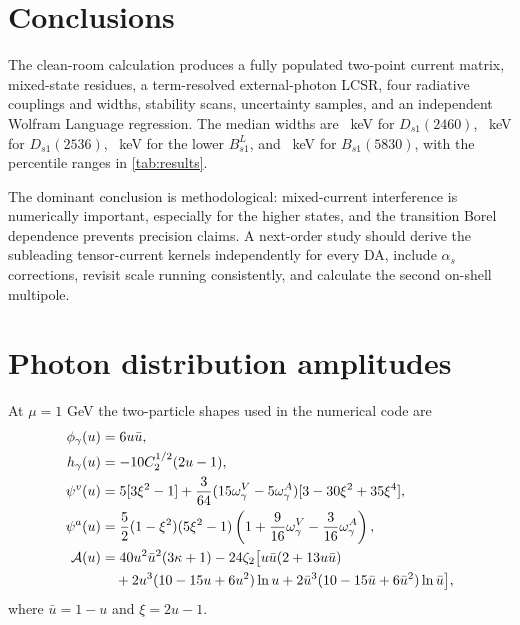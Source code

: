 \documentclass[11pt,a4paper]{article}
\begin{document}


\section{Conclusions}

The clean-room calculation produces a fully populated two-point current
matrix, mixed-state residues, a term-resolved external-photon LCSR, four
radiative couplings and widths, stability scans, uncertainty samples, and an
independent Wolfram Language regression.  The median widths are
\DsLowWidth\ keV for $D_{s1}(2460)$, \DsHighWidth\ keV for
$D_{s1}(2536)$, \BsLowWidth\ keV for the lower $B_{s1}^{L}$, and
\BsHighWidth\ keV for $B_{s1}(5830)$, with the percentile ranges in
\cref{tab:results}.

The dominant conclusion is methodological: mixed-current interference is
numerically important, especially for the higher states, and the transition
Borel dependence prevents precision claims.  A next-order study should
derive the subleading tensor-current kernels independently for every DA,
include $\alpha_s$ corrections, revisit scale running consistently, and
calculate the second on-shell multipole.

\appendix
\section{Photon distribution amplitudes}
\label{app:das}

At $\mu=1$ GeV the two-particle shapes used in the numerical code are
\begin{align}
\phi_\gamma(u)&=6u\bar u,\\
h_\gamma(u)&=-10C_2^{1/2}(2u-1),\\
\psi^v(u)&=5[3\xi^2-1]
+{3\over64}(15\omega_\gamma^V-5\omega_\gamma^A)
[3-30\xi^2+35\xi^4],\\
\psi^a(u)&={5\over2}(1-\xi^2)(5\xi^2-1)
\left(1+{9\over16}\omega_\gamma^V
-{3\over16}\omega_\gamma^A\right),\\
{\cal A}(u)&=40u^2\bar u^2(3\kappa+1)
-24\zeta_2\bigl[u\bar u(2+13u\bar u)\nonumber\\
&\quad+2u^3(10-15u+6u^2)\ln u
+2\bar u^3(10-15\bar u+6\bar u^2)\ln\bar u\bigr],
\end{align}
where $\bar u=1-u$ and $\xi=2u-1$.
\end{document}
